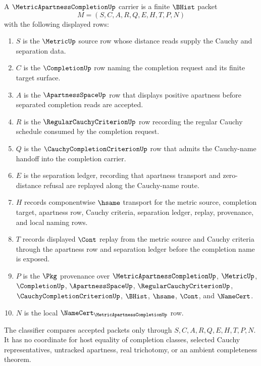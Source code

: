 \begin{definition}
\label{def:metric-apartness-completion-carrier}
A $\MetricApartnessCompletionUp$ carrier is a finite $\BHist$ packet
$$
M=(S,C,A,R,Q,E,H,T,P,N)
$$
with the following displayed rows:
\begin{enumerate}
\item $S$ is the $\MetricUp$ source row whose distance reads supply the Cauchy and separation data.
\item $C$ is the $\CompletionUp$ row naming the completion request and its finite target surface.
\item $A$ is the $\ApartnessSpaceUp$ row that displays positive apartness before separated completion reads are accepted.
\item $R$ is the $\RegularCauchyCriterionUp$ row recording the regular Cauchy schedule consumed by the completion request.
\item $Q$ is the $\CauchyCompletionCriterionUp$ row that admits the Cauchy-name handoff into the completion carrier.
\item $E$ is the separation ledger, recording that apartness transport and zero-distance refusal are replayed along the Cauchy-name route.
\item $H$ records componentwise $\hsame$ transport for the metric source, completion target, apartness row, Cauchy criteria, separation ledger, replay, provenance, and local naming rows.
\item $T$ records displayed $\Cont$ replay from the metric source and Cauchy criteria through the apartness row and separation ledger before the completion name is exposed.
\item $P$ is the $\Pkg$ provenance over $\MetricApartnessCompletionUp$, $\MetricUp$, $\CompletionUp$, $\ApartnessSpaceUp$, $\RegularCauchyCriterionUp$, $\CauchyCompletionCriterionUp$, $\BHist$, $\hsame$, $\Cont$, and $\NameCert$.
\item $N$ is the local $\NameCert_{\MetricApartnessCompletionUp}$ row.
\end{enumerate}
The classifier compares accepted packets only through $S,C,A,R,Q,E,H,T,P,N$. It has no coordinate for host equality of completion classes, selected Cauchy representatives, untracked apartness, real trichotomy, or an ambient completeness theorem.
\end{definition}

